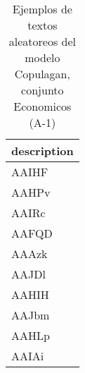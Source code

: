 \begin{table}[H]
\centering
\fontsize{8}{14}\selectfont
\caption{Ejemplos de textos aleatoreos del modelo Copulagan, conjunto Economicos (A-1)}
\label{table-sample10-economicos-a-1-copulagan-text}
\begin{tabular}{|m{50em}|}
\hline
\rowcolor[gray]{0.8}
description \\
\hline AAIHF \\
\hline AAHPv \\
\hline AAIRc \\
\hline AAFQD \\
\hline AAAzk \\
\hline AAJDl \\
\hline AAHIH \\
\hline AAJbm \\
\hline AAHLp \\
\hline AAIAi \\
\hline
\end{tabular}
\end{table}
